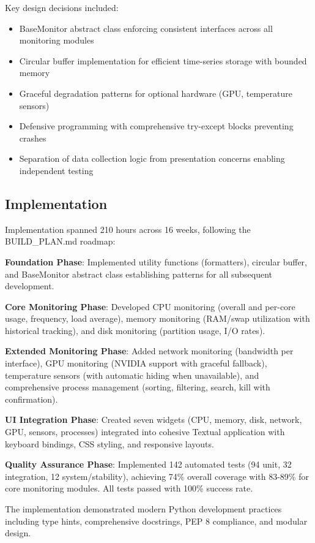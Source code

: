 \documentclass[12pt,a4paper,oneside]{report}
\begin{document}
Key design decisions included:
\begin{itemize}
    \item BaseMonitor abstract class enforcing consistent interfaces across all monitoring modules
    \item Circular buffer implementation for efficient time-series storage with bounded memory
    \item Graceful degradation patterns for optional hardware (GPU, temperature sensors)
    \item Defensive programming with comprehensive try-except blocks preventing crashes
    \item Separation of data collection logic from presentation concerns enabling independent testing
\end{itemize}

\subsection{Implementation}

Implementation spanned 210 hours across 16 weeks, following the BUILD\_PLAN.md roadmap:

\textbf{Foundation Phase}: Implemented utility functions (formatters), circular buffer, and BaseMonitor abstract class establishing patterns for all subsequent development.

\textbf{Core Monitoring Phase}: Developed CPU monitoring (overall and per-core usage, frequency, load average), memory monitoring (RAM/swap utilization with historical tracking), and disk monitoring (partition usage, I/O rates).

\textbf{Extended Monitoring Phase}: Added network monitoring (bandwidth per interface), GPU monitoring (NVIDIA support with graceful fallback), temperature sensors (with automatic hiding when unavailable), and comprehensive process management (sorting, filtering, search, kill with confirmation).

\textbf{UI Integration Phase}: Created seven widgets (CPU, memory, disk, network, GPU, sensors, processes) integrated into cohesive Textual application with keyboard bindings, CSS styling, and responsive layouts.

\textbf{Quality Assurance Phase}: Implemented 142 automated tests (94 unit, 32 integration, 12 system/stability), achieving 74\% overall coverage with 83-89\% for core monitoring modules. All tests passed with 100\% success rate.

The implementation demonstrated modern Python development practices including type hints, comprehensive docstrings, PEP 8 compliance, and modular design.
\end{document}
